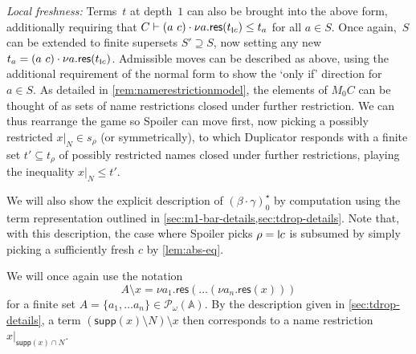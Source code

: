\documentclass[a4paper,UKenglish,cleveref,thm-restate,numberwithinsect,final]{lipics-v2021}
\newcommand{\res}{\mathsf{res}}
\newcommand{\Names}{\mathbb{A}}
\newcommand{\pow}{\mathcal{P}}
\newcommand{\powf}{\pow_{\omega}}
\newcommand{\supp}{\mathsf{supp}}
\theoremstyle{plain}
\newcommand{\midmid}{\hspace{0.2ex}{\rule[-0.1ex]{0.6pt}{1.65ex}}\hspace{0.2ex}}
\newcommand{\scriptmidmid}{\hspace{0.2ex}{\rule[-0.1ex]{0.6pt}{1.1ex}}\hspace{0.2ex}}
\newcommand{\newletter}[1]{{\midmid}#1}
\newcommand{\scriptnew}[1]{{\scriptmidmid}#1}
\numberwithin{equation}{section}
\newcommand{\+}[1]{\mathcal{#1}\xspace}
\theoremstyle{definition}
\begin{document}
\noindent\emph{Local freshness:}
Terms~$t$ at depth~$1$ can also be brought into the above form, additionally requiring that $C \vdash (a\ c) \cdot \nu a.\res(t_{\scriptnew{c}}) \le t_a$ for all $a \in S$.
Once again,~$S$ can be extended to finite supersets $S' \supseteq S$, now setting any new $t_a = (a\ c) \cdot \nu a.\res(t_{\scriptnew{c}})$.
Admissible moves can be described as above, using the additional requirement of the normal form to show the `only if' direction for $a \in S$.
As detailed in \cref{rem:namerestrictionmodel}, the elements of $M_0C$ can be thought of as sets of name restrictions closed under further restriction.
We can thus rearrange the game so Spoiler can move first, now picking a possibly restricted $x|_N \in s_\rho$ (or symmetrically), to which Duplicator responds with a finite set $t' \subseteq t_\rho$ of possibly restricted names closed under further restrictions, playing the inequality $x|_N \le t'$.

We will also show the explicit description of $(\beta \cdot \gamma)^\star_0$ by computation using the term representation outlined in \cref{sec:m1-bar-details,sec:tdrop-details}.
Note that, with this description, the case where Spoiler picks $\rho = \newletter{c}$ is subsumed by simply picking a sufficiently fresh $c$ by \cref{lem:abs-eq}.

We will once again use the notation
\begin{equation*}
  A \setminus x = \nu a_1.\res(\dots(\nu a_n.\res(x)))
\end{equation*}
for a finite set $A = \{a_1, \dots a_n\} \in \powf(\Names)$.
By the description given in \cref{sec:tdrop-details}, a term $(\supp(x) \setminus N) \setminus x$ then corresponds to a name restriction $x|_{\supp(x) \cap N}$.
\end{document}
